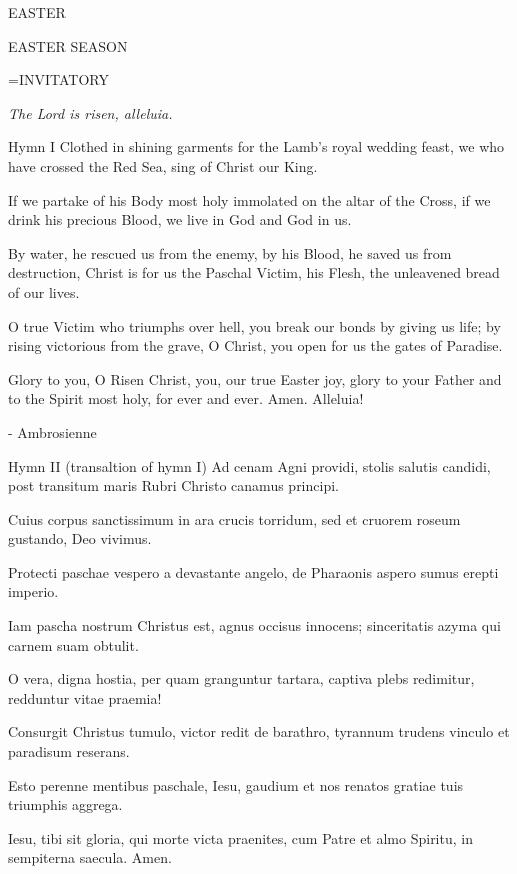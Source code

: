 \begin{center}\normalsize EASTER\\
\end{center}

EASTER SEASON

\hangindent=\parindent \small{INVITATORY}
\begin{center}
\textit{The Lord is risen, alleluia.\\}
\end{center}

Hymn I
Clothed in shining garments
for the Lamb's royal wedding feast,
we who have crossed the Red Sea,
sing of Christ our King.

If we partake of his Body most holy
immolated on the altar of the Cross,
if we drink his precious Blood,
we live in God and God in us.

By water, he rescued us from the enemy,
by his Blood, he saved us from destruction,
Christ is for us the Paschal Victim,
his Flesh, the unleavened bread of our lives.

O true Victim who triumphs over hell,
you break our bonds by giving us life;
by rising victorious from the grave,
O Christ, you open for us the gates of Paradise.

Glory to you, O Risen Christ,
you, our true Easter joy,
glory to your Father and to the Spirit most holy,
for ever and ever. Amen. Alleluia!

- Ambrosienne

Hymn II (transaltion of hymn I)
Ad cenam Agni providi,
stolis salutis candidi,
post transitum maris Rubri
Christo canamus principi.

Cuius corpus sanctissimum
in ara crucis torridum,
sed et cruorem roseum
gustando, Deo vivimus.

Protecti paschae vespero
a devastante angelo,
de Pharaonis aspero
sumus erepti imperio.

Iam pascha nostrum Christus est,
agnus occisus innocens;
sinceritatis azyma
qui carnem suam obtulit.

O vera, digna hostia,
per quam granguntur tartara,
captiva plebs redimitur,
redduntur vitae praemia!

Consurgit Christus tumulo,
victor redit de barathro,
tyrannum trudens vinculo
et paradisum reserans.

Esto perenne mentibus
paschale, Iesu, gaudium
et nos renatos gratiae
tuis triumphis aggrega.

Iesu, tibi sit gloria,
qui morte victa praenites,
cum Patre et almo Spiritu,
in sempiterna saecula. Amen.


